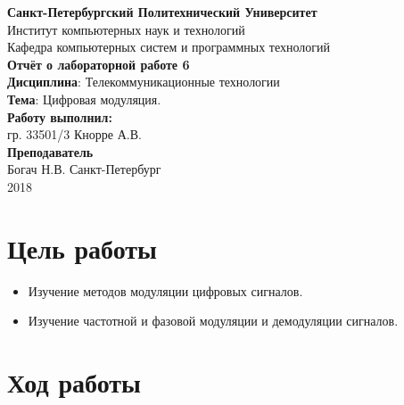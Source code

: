 \documentclass[a4paper,14pt]{extarticle}
\begin{document}
\begin{titlepage}
\centering 
{\bfseries Санкт-Петербургский Политехнический Университет} \\
Институт компьютерных наук и технологий \\
Кафедра компьютерных систем и программных технологий \\
\vspace{5cm}
{\centering \textbf{Отчёт о лабораторной работе 6} \\ 
\vspace{0.2cm}
\textbf{Дисциплина}: Телекоммуникационные технологии \\
\vspace{0.2cm}
\textbf{Тема}: Цифровая модуляция. } \\
\vspace{4cm}
\hfill {\bfseries Работу выполнил:}  \\
\hfill гр. 33501/3 Кнорре А.В. \\
\hfill {\bfseries Преподаватель}  \\
\hfill Богач Н.В.
\vfill
Санкт-Петербург \\
{\large 2018}
\end{titlepage}

\section{Цель работы}
\begin{itemize}
\item Изучение методов модуляции цифровых сигналов. 

\item Изучение частотной и фазовой модуляции и демодуляции сигналов.
\end{itemize}

\section{Ход работы}
\end{document}
